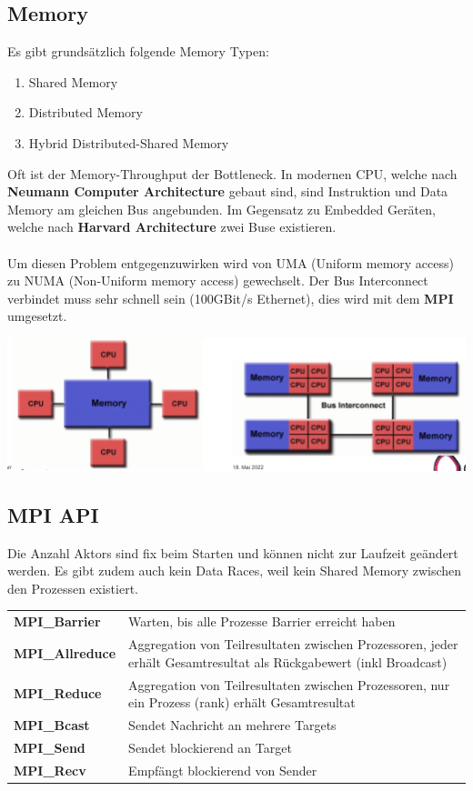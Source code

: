 \subsection{Memory}
Es gibt grundsätzlich folgende Memory Typen:
\begin{enumerate}[nosep]
	\item Shared Memory
	\item Distributed Memory
	\item Hybrid Distributed-Shared Memory
\end{enumerate}

Oft ist der Memory-Throughput der Bottleneck. In modernen CPU, welche nach \textbf{Neumann Computer Architecture} gebaut sind, sind Instruktion und Data Memory am gleichen Bus angebunden. Im Gegensatz zu Embedded Geräten, welche nach \textbf{Harvard Architecture} zwei Buse existieren.
~\\~\\
Um diesen Problem entgegenzuwirken wird von UMA (Uniform memory access) zu NUMA (Non-Uniform memory access) gewechselt. Der Bus Interconnect verbindet muss sehr schnell sein (100GBit/s Ethernet), dies wird mit dem \textbf{MPI} umgesetzt. 
\begin{center}
	\includegraphics[width=0.6\columnwidth]{Images/uma}
\end{center}


\subsection{MPI API}
Die Anzahl Aktors sind fix beim Starten und können nicht zur Laufzeit geändert werden. Es gibt zudem auch kein Data Races, weil kein Shared Memory zwischen den Prozessen existiert.
\begin{tabular}{p{4cm}|p{4cm}}
	\textbf{MPI\_Barrier} & Warten, bis alle Prozesse Barrier erreicht haben \\
	\textbf{MPI\_Allreduce} & Aggregation von Teilresultaten zwischen Prozessoren, jeder erhält Gesamtresultat als Rückgabewert (inkl Broadcast) \\
	\textbf{MPI\_Reduce} & Aggregation von Teilresultaten zwischen Prozessoren, nur ein Prozess (rank) erhält Gesamtresultat \\
	\textbf{MPI\_Bcast} & Sendet Nachricht an mehrere Targets\\
	\textbf{MPI\_Send} & Sendet blockierend an Target \\
	\textbf{MPI\_Recv} & Empfängt blockierend von Sender \\
\end{tabular}

